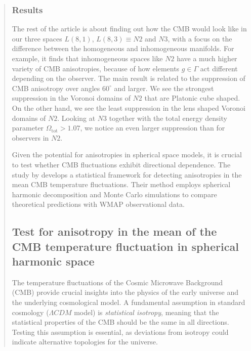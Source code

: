 \documentclass{article}
\theoremstyle{definition}
\begin{document}
\begin{abstract}
\subsubsection{Results}

The rest of the article is about finding out how the CMB would look like in our three spaces $L(8,1)$, $L(8,3)\equiv N2$ and $N3$, with a focus on the difference between the homogeneous and inhomogeneous manifolds. For example, it finds that inhomogeneous spaces like $N2$ have a much higher variety of CMB anisotropies, because of how elements $g\in\Gamma$ act different depending on the observer. The main result is related to the suppression of CMB anisotropy over angles $60^\circ$ and larger. We see the strongest suppression in the Voronoi domains of $N2$ that are Platonic cube shaped. On the other hand, we see the least suppression in the lens shaped Voronoi domains of $N2$. Looking at $N3$ together with the total energy density parameter $\Omega_\text{tot}>1.07$, we notice an even larger suppression than for observers in $N2$.

Given the potential for anisotropies in spherical space models, it is crucial to test whether CMB fluctuations exhibit directional dependence. The study by \cite{Kashino_2012} develops a statistical framework for detecting anisotropies in the mean CMB temperature fluctuations. Their method employs spherical harmonic decomposition and Monte Carlo simulations to compare theoretical predictions with WMAP observational data.






\subsection{Test for anisotropy in the mean of the CMB temperature fluctuation in spherical harmonic space}
The temperature fluctuations of the Cosmic Microwave Background (CMB) provide crucial insights into the physics of the early universe and the underlying cosmological model.
A fundamental assumption in standard cosmology ($\Lambda CDM$ model) is \textit{statistical isotropy}, meaning that the statistical properties of the CMB should be the same in all directions. Testing this assumption is essential, as deviations from isotropy could indicate alternative topologies for the universe.


\end{abstract}
\end{document}
